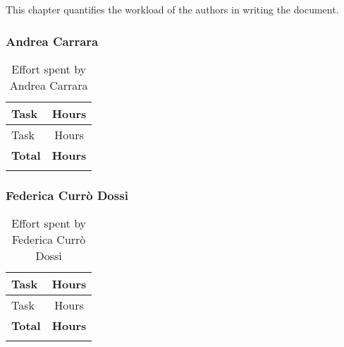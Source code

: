 This chapter quantifies the workload of the authors in writing the document.

\subsubsection{Andrea Carrara}
\renewcommand{\arraystretch}{1.5}
\begin{longtable}{|p{8.5cm}|c|}
    \hline \rowcolor{polimiblue!40}
    \textbf{Task} & \textbf{Hours} \\ \hline
    Task & Hours \\ \hline
    \hline \rowcolor{polimiblue!40}
    \textbf{Total} & \textbf{Hours} \\ \hline
\caption{Effort spent by Andrea Carrara}
\end{longtable}

\subsubsection{Federica Currò Dossi}
\renewcommand{\arraystretch}{1.5}
\begin{longtable}{|p{8.5cm}|c|}
    \hline \rowcolor{polimiblue!40}
    \textbf{Task} & \textbf{Hours} \\ \hline
    Task & Hours \\ \hline
    \hline \rowcolor{polimiblue!40}
    \textbf{Total} & \textbf{Hours} \\ \hline
\caption{Effort spent by Federica Currò Dossi}
\end{longtable}
